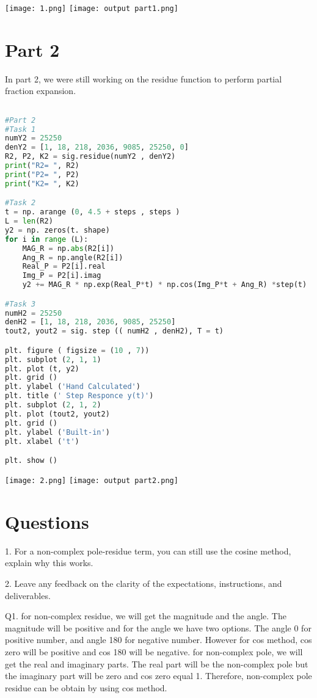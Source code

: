 \documentclass[12pt]{report}
\begin{document}
\texttt{[image: 1.png]}
\texttt{[image: output part1.png]}
\section{Part 2 }

In part 2, we were still working on the residue function to perform partial fraction expansion.  

\begin{lstlisting}[language=Python]

#Part 2
#Task 1
numY2 = 25250
denY2 = [1, 18, 218, 2036, 9085, 25250, 0]
R2, P2, K2 = sig.residue(numY2 , denY2)
print("R2= ", R2)
print("P2= ", P2)
print("K2= ", K2)

#Task 2
t = np. arange (0, 4.5 + steps , steps ) 
L = len(R2) 
y2 = np. zeros(t. shape)
for i in range (L):
    MAG_R = np.abs(R2[i])
    Ang_R = np.angle(R2[i])
    Real_P = P2[i].real
    Img_P = P2[i].imag
    y2 += MAG_R * np.exp(Real_P*t) * np.cos(Img_P*t + Ang_R) *step(t)

#Task 3
numH2 = 25250
denH2 = [1, 18, 218, 2036, 9085, 25250]
tout2, yout2 = sig. step (( numH2 , denH2), T = t)

plt. figure ( figsize = (10 , 7))
plt. subplot (2, 1, 1)
plt. plot (t, y2)
plt. grid ()
plt. ylabel ('Hand Calculated')
plt. title (' Step Responce y(t)')
plt. subplot (2, 1, 2)
plt. plot (tout2, yout2)
plt. grid ()
plt. ylabel ('Built-in')
plt. xlabel ('t')

plt. show ()


\end{lstlisting}

\texttt{[image: 2.png]}
\texttt{[image: output part2.png]}




\section{Questions}
1. For a non-complex pole-residue term, you can still use the cosine method, explain why this
works.

2. Leave any feedback on the clarity of the expectations, instructions, and deliverables. 

Q1. for non-complex residue, we will get the magnitude and the angle. The magnitude will be positive and for the angle we have two options. The angle 0 for positive number, and angle 180 for negative number. However for cos method, cos zero will be positive and cos 180 will be negative.
for non-complex pole, we will get the real and imaginary parts. The real part will be the non-complex pole but the imaginary part will be zero and cos zero equal 1. Therefore, non-complex pole residue can be obtain by using cos method.
\end{document}
